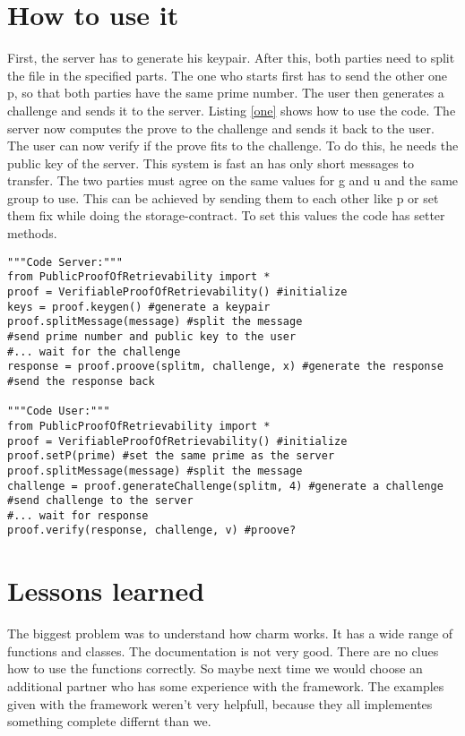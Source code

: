 \documentclass{amsart}
\begin{document}
\section{How to use it}
First, the server has to generate his keypair. After this, both parties need to split the file in the specified parts. The one who starts first has to send the other one p, so that both parties have the same prime number. The user then generates a challenge and sends it to the server. Listing \ref{one} shows how to use the code. The server now computes the prove to the challenge and sends it back to the user. The user can now verify if the prove fits to the challenge. To do this, he needs the public key of the server. This system is fast an has only short messages to transfer. The two parties must agree on the same values for g and u and the same group to use. This can be achieved by sending them to each other like p or set them fix while doing the storage-contract. To set this values the code has setter methods.
\lstset{
	breaklines=true,
	language=Python,
	frame=single,
	numbers=left,
	numbersep=5pt
}
\begin{lstlisting}[caption=How to Use Code, label=one]
"""Code Server:"""
from PublicProofOfRetrievability import *
proof = VerifiableProofOfRetrievability() #initialize
keys = proof.keygen() #generate a keypair
proof.splitMessage(message) #split the message
#send prime number and public key to the user
#... wait for the challenge
response = proof.proove(splitm, challenge, x) #generate the response
#send the response back

"""Code User:"""
from PublicProofOfRetrievability import *
proof = VerifiableProofOfRetrievability() #initialize
proof.setP(prime) #set the same prime as the server
proof.splitMessage(message) #split the message
challenge = proof.generateChallenge(splitm, 4) #generate a challenge
#send challenge to the server
#... wait for response
proof.verify(response, challenge, v) #proove?
\end{lstlisting}

\section{Lessons learned}
The biggest problem was to understand how charm works. It has a wide range of functions and classes. The documentation is not very good. There are no clues how to use the functions correctly. So maybe next time we would choose an additional partner who has some experience with the framework. The examples given with the framework weren't very helpfull, because they all implementes something complete differnt than we.
\end{document}
